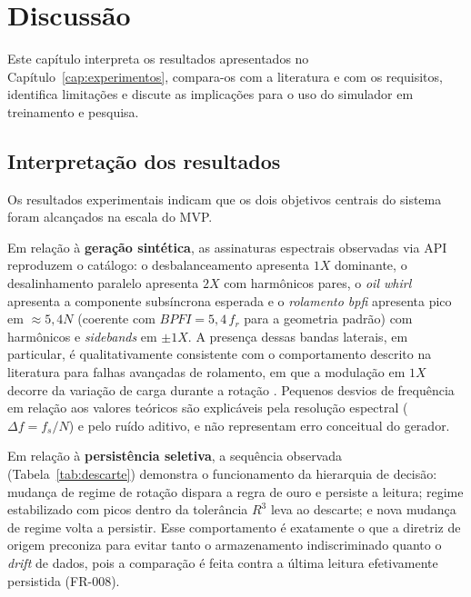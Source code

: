 \chapter{Discussão}
\label{cap:discussao}

Este capítulo interpreta os resultados apresentados no
Capítulo~\ref{cap:experimentos}, compara-os com a literatura e com os
requisitos, identifica limitações e discute as implicações para o uso do
simulador em treinamento e pesquisa.

\section{Interpretação dos resultados}

Os resultados experimentais indicam que os dois objetivos centrais do sistema
foram alcançados na escala do MVP.

Em relação à \textbf{geração sintética}, as assinaturas espectrais observadas
via API reproduzem o catálogo: o desbalanceamento apresenta \(1X\) dominante, o
desalinhamento paralelo apresenta \(2X\) com harmônicos pares, o \emph{oil
whirl} apresenta a componente subsíncrona esperada e o \emph{rolamento bpfi}
apresenta pico em \(\approx 5{,}4N\) (coerente com \(BPFI = 5{,}4\,f_r\) para a
geometria padrão) com harmônicos e \emph{sidebands} em \(\pm 1X\). A presença
dessas bandas laterais, em particular, é qualitativamente consistente com o
comportamento descrito na literatura para falhas avançadas de rolamento, em que
a modulação em \(1X\) decorre da variação de carga durante a rotação
\cite{randall2011}. Pequenos desvios de frequência em relação aos valores
teóricos são explicáveis pela resolução espectral (\(\Delta f = f_s/N\)) e pelo
ruído aditivo, e não representam erro conceitual do gerador.

Em relação à \textbf{persistência seletiva}, a sequência observada
(Tabela~\ref{tab:descarte}) demonstra o funcionamento da hierarquia de decisão:
mudança de regime de rotação dispara a regra de ouro e persiste a leitura;
regime estabilizado com picos dentro da tolerância \(R^3\) leva ao descarte; e
nova mudança de regime volta a persistir. Esse comportamento é exatamente o que
a diretriz de origem preconiza para evitar tanto o armazenamento indiscriminado
quanto o \emph{drift} de dados, pois a comparação é feita contra a última
leitura efetivamente persistida (FR-008).

